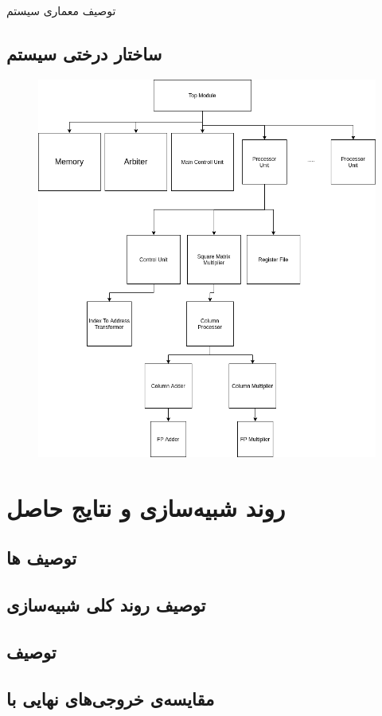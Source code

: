 \documentclass[]{article}
\begin{document}
\begin{section-container}{توصیف معماری سیستم}
\pagebreak
\subsection{ساختار درختی سیستم}

	\begin{figure}[h]
	\centering
	\includegraphics[width=0.87\linewidth]{source/tree.png}
	\caption{}
\end{figure}

\end{section-container}

\pagebreak
\section{روند شبیه‌سازی و نتایج حاصل}
\subsection{توصیف ها}
\subsection{توصیف روند کلی شبیه‌سازی}
\subsection{توصیف }
\subsection{مقایسه‌ی خروجی‌های نهایی با }
\end{document}
